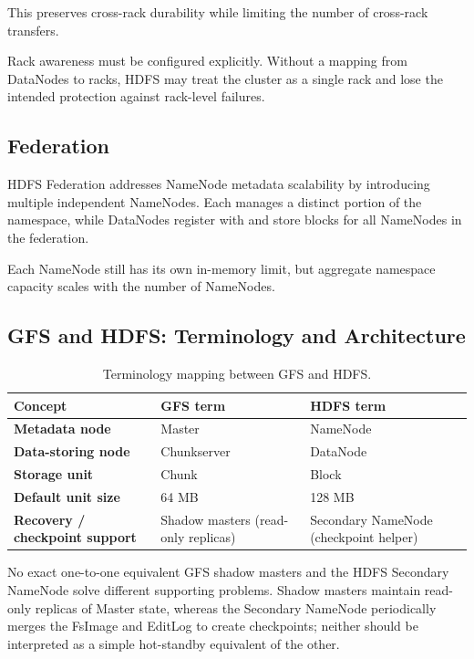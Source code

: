 \documentclass[11pt,a4paper,oneside]{book}
\begin{document}
This preserves cross-rack durability while limiting the number of cross-rack transfers.

Rack awareness must be configured explicitly. Without a mapping from DataNodes to racks, HDFS may treat the cluster as a single rack and lose the intended protection against rack-level failures.

\subsection{Federation}

HDFS Federation addresses NameNode metadata scalability by introducing multiple independent NameNodes. Each manages a distinct portion of the namespace, while DataNodes register with and store blocks for all NameNodes in the federation.

Each NameNode still has its own in-memory limit, but aggregate namespace capacity scales with the number of NameNodes.

\subsection{GFS and HDFS: Terminology and Architecture}

\begin{table}[htbp]
\centering
\caption{Terminology mapping between GFS and HDFS.}
\label{tab:terminology-mapping}
\begin{tabularx}{0.80\textwidth}{>{\bfseries}Y Y Y}
\toprule
{}
Concept & GFS term & HDFS term \\
\midrule
Metadata node & Master & NameNode \\
Data-storing node & Chunkserver & DataNode \\
Storage unit & Chunk & Block \\
Default unit size & 64 MB & 128 MB \\
Recovery / checkpoint support & Shadow masters (read-only replicas) & Secondary NameNode (checkpoint helper) \\
\bottomrule
\end{tabularx}
\end{table}

\begin{remarkbox}{No exact one-to-one equivalent}
GFS shadow masters and the HDFS Secondary NameNode solve different supporting problems. Shadow masters maintain read-only replicas of Master state, whereas the Secondary NameNode periodically merges the FsImage and EditLog to create checkpoints; neither should be interpreted as a simple hot-standby equivalent of the other.
\end{remarkbox}
\end{document}
